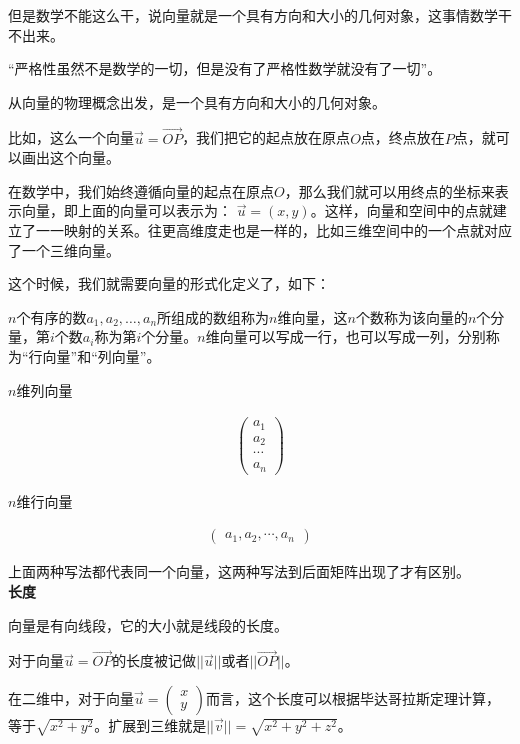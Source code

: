 \documentclass[UTF8]{ctexbook}
\begin{document}
但是数学不能这么干，说向量就是一个具有方向和大小的几何对象，这事情数学干不出来。

“严格性虽然不是数学的一切，但是没有了严格性数学就没有了一切”。

从向量的物理概念出发，是一个具有方向和大小的几何对象。

比如，这么一个向量$\vec{u}=\overrightarrow{OP}$，我们把它的起点放在原点$O$点，终点放在$P$点，就可以画出这个向量。

在数学中，我们始终遵循向量的起点在原点$O$，那么我们就可以用终点的坐标来表示向量，即上面的向量可以表示为： $\vec{u}=(x,y)$。这样，向量和空间中的点就建立了一一映射的关系。往更高维度走也是一样的，比如三维空间中的一个点就对应了一个三维向量。

这个时候，我们就需要向量的形式化定义了，如下：

$n$个有序的数$a_{1},a_{2},\dots,a_{n}$所组成的数组称为$n$维向量，这$n$个数称为该向量的$n$个分量，第$i$个数$a_{i}$称为第$i$个分量。$n$维向量可以写成一行，也可以写成一列，分别称为“行向量”和“列向量”。

$n$维列向量

\begin{equation}
\begin{aligned}
\begin{pmatrix}
a_{1}\\
a_{2}\\
\cdots\\
a_{n}
\end{pmatrix}
\end{aligned}
\end{equation}

$n$维行向量

\begin{equation}
\begin{aligned}
\begin{pmatrix}
a_{1},a_{2},\cdots,a_{n}
\end{pmatrix}
\end{aligned}
\end{equation}

上面两种写法都代表同一个向量，这两种写法到后面矩阵出现了才有区别。 \\

\textbf{长度}

向量是有向线段，它的大小就是线段的长度。

对于向量$\vec{u}=\overrightarrow{OP}$的长度被记做$||\vec{u}||$或者$||\overrightarrow{OP}||$。

在二维中，对于向量$\vec{u}=\begin{pmatrix} x\\ y \end{pmatrix}$而言，这个长度可以根据毕达哥拉斯定理计算，等于$\sqrt{x^{2}+y^{2}}$。扩展到三维就是$||\vec{v}||=\sqrt{x^{2}+y^{2}+z^{2}}$。
\end{document}

